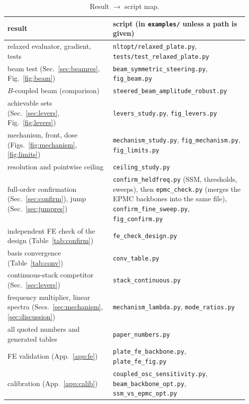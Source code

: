 \begin{table}[!tbp]
\centering\footnotesize
\caption{Result $\to$ script map.}\label{tab:repro}
\begin{tabular}{@{}>{\raggedright\arraybackslash}p{0.42\linewidth}>{\raggedright\arraybackslash}p{0.54\linewidth}@{}}
\toprule
result & script (in \texttt{examples/} unless a path is given)\\ \midrule
relaxed evaluator, gradient, tests & \texttt{nltopt/relaxed\_plate.py}, \texttt{tests/test\_relaxed\_plate.py}\\
beam test (Sec.~\ref{sec:beamres}, Fig.~\ref{fig:beam}) & \texttt{beam\_symmetric\_steering.py}, \texttt{fig\_beam.py}\\
$B$-coupled beam (comparison) & \texttt{steered\_beam\_amplitude\_robust.py}\\
achievable sets (Sec.~\ref{sec:levers}, Fig.~\ref{fig:levers}) & \texttt{levers\_study.py}, \texttt{fig\_levers.py}\\
mechanism, front, dose (Figs.~\ref{fig:mechanism}, \ref{fig:limits}) & \texttt{mechanism\_study.py}, \texttt{fig\_mechanism.py}, \texttt{fig\_limits.py}\\
resolution and pointwise ceiling & \texttt{ceiling\_study.py}\\
full-order confirmation (Sec.~\ref{sec:confirm}), jump (Sec.~\ref{sec:jumpres}) & \texttt{confirm\_heldfreq.py} (SSM, thresholds, sweeps), then \texttt{epmc\_check.py} (merges the EPMC backbones into the same file), \texttt{confirm\_fine\_sweep.py}, \texttt{fig\_confirm.py}\\
independent FE check of the design (Table~\ref{tab:confirm}) & \texttt{fe\_check\_design.py}\\
basis convergence (Table~\ref{tab:conv}) & \texttt{conv\_table.py}\\
continuous-stack competitor (Sec.~\ref{sec:levers}) & \texttt{stack\_continuous.py}\\
frequency multiplier, linear spectra (Secs.~\ref{sec:mechanism}, \ref{sec:discussion}) & \texttt{mechanism\_lambda.py}, \texttt{mode\_ratios.py}\\
all quoted numbers and generated tables & \texttt{paper\_numbers.py}\\
FE validation (App.~\ref{app:fe}) & \texttt{plate\_fe\_backbone.py}, \texttt{plate\_fe\_fig.py}\\
calibration (App.~\ref{app:calib}) & \texttt{coupled\_osc\_sensitivity.py}, \texttt{beam\_backbone\_opt.py}, \texttt{ssm\_vs\_epmc\_opt.py}\\

\end{tabular}
\end{table}
